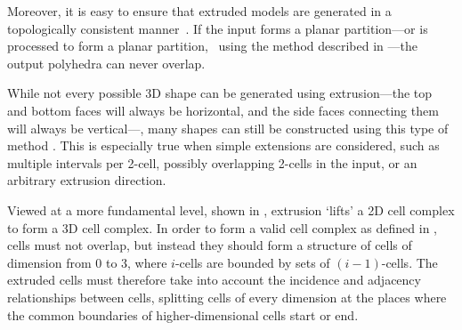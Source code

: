 Moreover, it is easy to ensure that extruded models are generated in a topologically consistent manner~\citep{Ledoux11a}.
If the input forms a planar partition---or is processed to form a planar partition, \eg\ using the method described in ---the output polyhedra can never overlap.

While not every possible 3D shape can be generated using extrusion---the top and bottom faces will always be horizontal, and the side faces connecting them will always be vertical---, many shapes can still be constructed using this type of method \citep{Ferrucci93}.
This is especially true when simple extensions are considered, such as multiple intervals per 2-cell, possibly overlapping 2-cells in the input, or an arbitrary extrusion direction.

Viewed at a more fundamental level, shown in , extrusion `lifts' a 2D cell complex to form a 3D cell complex.
In order to form a valid cell complex as defined in , cells must not overlap, but instead they should form a structure of cells of dimension from 0 to 3, where $i$-cells are bounded by sets of $(i-1)$-cells.
The extruded cells must therefore take into account the incidence and adjacency relationships between cells, splitting cells of every dimension at the places where the common boundaries of higher-dimensional cells start or end.
